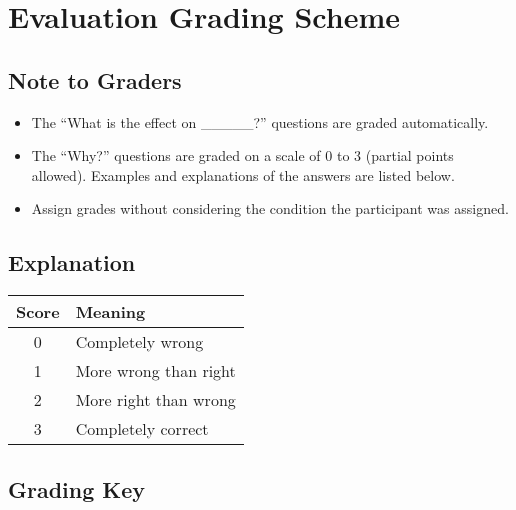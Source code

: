 \chapter{Evaluation Grading Scheme}

\section{Note to Graders}

\begin{itemize}
\item The ``What is the effect on \_\_\_\_\_?'' questions are graded automatically.
\item The ``Why?'' questions are graded on a scale of 0 to 3 (partial points allowed).  Examples and explanations of the answers are listed below.
\item Assign grades without considering the condition the participant was assigned. 
\end{itemize}

\section{Explanation}

\begin{tabular}{| c | l |} \hline
\rowcolor{gray!35} \textbf{Score} & \textbf{Meaning} \\ \hline
0 & Completely wrong \\ 
1 & More wrong than right \\ 
2 & More right than wrong \\ 
3 & Completely correct \\
\hline
\end{tabular}


\clearpage

\section{Grading Key}

